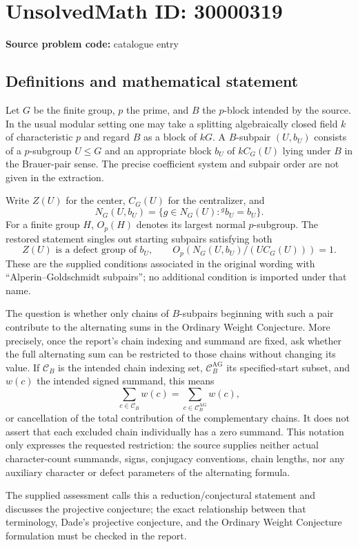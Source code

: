 \documentclass[11pt]{article}
\begin{document}
\section*{UnsolvedMath ID: 30000319}
\textbf{Source problem code:} catalogue entry
\subsection{Definitions and mathematical statement}
Let $G$ be the finite group, $p$ the prime, and $B$ the $p$-block intended by the source. In the usual modular setting one may take a splitting algebraically closed field $k$ of characteristic $p$ and regard $B$ as a block of $kG$. A $B$-subpair $(U,b_U)$ consists of a $p$-subgroup $U\le G$ and an appropriate block $b_U$ of $kC_G(U)$ lying under $B$ in the Brauer-pair sense. The precise coefficient system and subpair order are not given in the extraction.

Write $Z(U)$ for the center, $C_G(U)$ for the centralizer, and
\[
 N_G(U,b_U)=\{g\in N_G(U):{}^g b_U=b_U\}.
\]
For a finite group $H$, $O_p(H)$ denotes its largest normal $p$-subgroup. The restored statement singles out starting subpairs satisfying both
\[
 Z(U)\text{ is a defect group of }b_U,
 \qquad
 O_p\!\left(N_G(U,b_U)/(UC_G(U))\right)=1.
\]
These are the supplied conditions associated in the original wording with ``Alperin--Goldschmidt subpairs''; no additional condition is imported under that name.

The question is whether only chains of $B$-subpairs beginning with such a pair contribute to the alternating sums in the Ordinary Weight Conjecture. More precisely, once the report's chain indexing and summand are fixed, ask whether the full alternating sum can be restricted to those chains without changing its value. If $\mathcal C_B$ is the intended chain indexing set, $\mathcal C_B^{\mathrm{AG}}$ its specified-start subset, and $w(c)$ the intended signed summand, this means
\[
 \sum_{c\in\mathcal C_B}w(c)
 =\sum_{c\in\mathcal C_B^{\mathrm{AG}}}w(c),
\]
or cancellation of the total contribution of the complementary chains. It does not assert that each excluded chain individually has a zero summand. This notation only expresses the requested restriction: the source supplies neither actual character-count summands, signs, conjugacy conventions, chain lengths, nor any auxiliary character or defect parameters of the alternating formula.

The supplied assessment calls this a reduction/conjectural statement and discusses the projective conjecture; the exact relationship between that terminology, Dade's projective conjecture, and the Ordinary Weight Conjecture formulation must be checked in the report.
\end{document}
